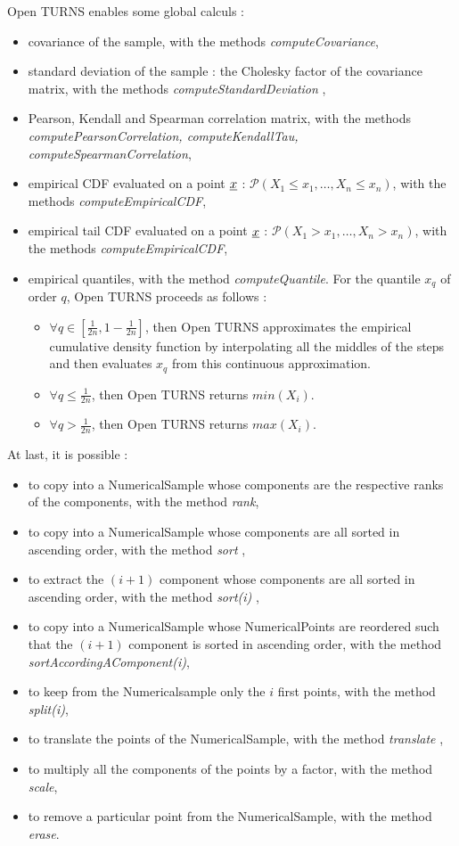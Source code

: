 Open TURNS enables some global calculs :
\begin{itemize}
\item covariance of the sample, with the methods {\itshape computeCovariance},
\item standard deviation of the sample : the Cholesky factor of the covariance matrix, with the methods {\itshape computeStandardDeviation },
\item Pearson, Kendall and Spearman correlation matrix, with the methods {\itshape computePearsonCorrelation, computeKendallTau, computeSpearmanCorrelation},
\item empirical CDF evaluated on a point ${\underline{x}}$ : $\mathcal{P}(X_1 \leq x_1, \hdots, X_n \leq x_n)$, with the methods {\itshape computeEmpiricalCDF},
\item empirical tail CDF evaluated on a point ${\underline{x}}$ : $\mathcal{P}(X_1 > x_1, \hdots, X_n > x_n)$, with the methods {\itshape computeEmpiricalCDF},
\item empirical quantiles, with the method {\itshape computeQuantile}. For the quantile $x_q$ of order $q$, Open TURNS proceeds as follows : 
\begin{itemize}
   \item $\forall q \in [\frac{1}{2n}, 1-\frac{1}{2n}]$, then Open TURNS approximates the empirical  cumulative density function by interpolating all the middles of the steps and then evaluates  $x_q$ from this continuous approximation. 
   \item $\forall q \leq \frac{1}{2n}$, then Open TURNS returns $min(X_i)$.
   \item $\forall q > \frac{1}{2n}$, then Open TURNS returns $max(X_i)$.
\end{itemize}
\end{itemize}

At last, it is possible :
\begin{itemize}
\item to copy into a NumericalSample whose components are the respective ranks of the components, with the method {\itshape rank},
\item to copy into a NumericalSample whose components are all sorted in ascending order, with the method {\itshape sort },
\item to extract the $(i+1)$ component whose components are all sorted in ascending order, with the method {\itshape sort(i) },
\item to copy into a NumericalSample whose NumericalPoints are reordered such that the $(i+1)$ component is sorted in ascending order, with the method  {\itshape sortAccordingAComponent(i)},
\item to keep from the Numericalsample only the $i$ first points, with the method  {\itshape split(i)},
\item to translate the points of the NumericalSample, with the method  {\itshape translate },
\item to multiply all the components of the points by a factor, with the method  {\itshape  scale},
\item to remove a particular point from the NumericalSample, with the method  {\itshape  erase}.
\end{itemize}



